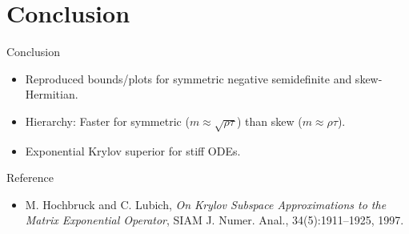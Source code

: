 \documentclass{beamer}
\begin{document}
\section{Conclusion}

\begin{frame}{Conclusion}
    \begin{itemize}
        \item Reproduced bounds/plots for symmetric negative semidefinite and skew-Hermitian.
        \item Hierarchy: Faster for symmetric ($m \approx \sqrt{\rho\tau}$) than skew ($m \approx \rho\tau$).
        \item Exponential Krylov superior for stiff ODEs.
    \end{itemize}
\end{frame}

\begin{frame}{Reference}
    \begin{itemize}
        \item M. Hochbruck and C. Lubich, \emph{On Krylov Subspace Approximations to the Matrix Exponential Operator}, SIAM J. Numer. Anal., 34(5):1911--1925, 1997.
    \end{itemize}
\end{frame}
\end{document}
